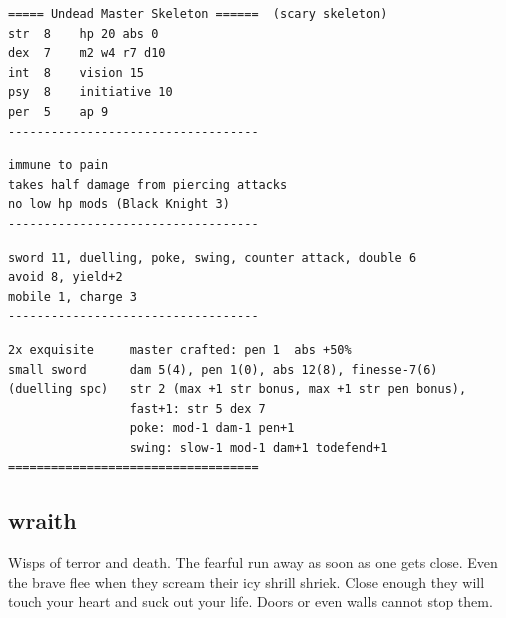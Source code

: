 \small \begin{samepage} \begin{verbatim}
===== Undead Master Skeleton ======  (scary skeleton)
str  8    hp 20 abs 0
dex  7    m2 w4 r7 d10
int  8    vision 15
psy  8    initiative 10
per  5    ap 9
-----------------------------------
\end{verbatim} \end{samepage} \goodbreak \begin{samepage} \begin{verbatim}
immune to pain
takes half damage from piercing attacks
no low hp mods (Black Knight 3)
-----------------------------------
\end{verbatim} \end{samepage} \goodbreak \begin{samepage} \begin{verbatim}
sword 11, duelling, poke, swing, counter attack, double 6
avoid 8, yield+2
mobile 1, charge 3
-----------------------------------
\end{verbatim} \end{samepage} \goodbreak \begin{samepage} \begin{verbatim}
2x exquisite     master crafted: pen 1  abs +50%
small sword      dam 5(4), pen 1(0), abs 12(8), finesse-7(6)
(duelling spc)   str 2 (max +1 str bonus, max +1 str pen bonus),
                 fast+1: str 5 dex 7
                 poke: mod-1 dam-1 pen+1
                 swing: slow-1 mod-1 dam+1 todefend+1
===================================
\end{verbatim} \end{samepage} \normalsize


\goodbreak 
\subsection*{wraith}
\label{wraith}

Wisps of terror and death. The fearful run away as soon as one gets close. Even the brave flee when they scream their icy shrill shriek. Close enough they will touch your heart and suck out your life. Doors or even walls cannot stop them.

\

